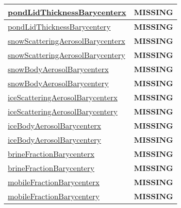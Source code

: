 {\begin{center}
\begin{longtable}{| p{2.0in} | p{4.0in} |}
    \hline
    \hyperref[subsec:var_sec_tracer_barycenter_pondLidThicknessBarycenterx]{pondLidThicknessBarycenterx} & {\bf \color{red} MISSING} \\
    \hline
    \hyperref[subsec:var_sec_tracer_barycenter_pondLidThicknessBarycentery]{pondLidThicknessBarycentery} & {\bf \color{red} MISSING} \\
    \hline
    \hyperref[subsec:var_sec_tracer_barycenter_snowScatteringAerosolBarycenterx]{snowScatteringAerosol\-Barycenterx} & {\bf \color{red} MISSING} \\
    \hline
    \hyperref[subsec:var_sec_tracer_barycenter_snowScatteringAerosolBarycentery]{snowScatteringAerosol\-Barycentery} & {\bf \color{red} MISSING} \\
    \hline
    \hyperref[subsec:var_sec_tracer_barycenter_snowBodyAerosolBarycenterx]{snowBodyAerosolBarycenterx} & {\bf \color{red} MISSING} \\
    \hline
    \hyperref[subsec:var_sec_tracer_barycenter_snowBodyAerosolBarycentery]{snowBodyAerosolBarycentery} & {\bf \color{red} MISSING} \\
    \hline
    \hyperref[subsec:var_sec_tracer_barycenter_iceScatteringAerosolBarycenterx]{iceScatteringAerosolBarycenterx} & {\bf \color{red} MISSING} \\
    \hline
    \hyperref[subsec:var_sec_tracer_barycenter_iceScatteringAerosolBarycentery]{iceScatteringAerosolBarycentery} & {\bf \color{red} MISSING} \\
    \hline
    \hyperref[subsec:var_sec_tracer_barycenter_iceBodyAerosolBarycenterx]{iceBodyAerosolBarycenterx} & {\bf \color{red} MISSING} \\
    \hline
    \hyperref[subsec:var_sec_tracer_barycenter_iceBodyAerosolBarycentery]{iceBodyAerosolBarycentery} & {\bf \color{red} MISSING} \\
    \hline
    \hyperref[subsec:var_sec_tracer_barycenter_brineFractionBarycenterx]{brineFractionBarycenterx} & {\bf \color{red} MISSING} \\
    \hline
    \hyperref[subsec:var_sec_tracer_barycenter_brineFractionBarycentery]{brineFractionBarycentery} & {\bf \color{red} MISSING} \\
    \hline
    \hyperref[subsec:var_sec_tracer_barycenter_mobileFractionBarycenterx]{mobileFractionBarycenterx} & {\bf \color{red} MISSING} \\
    \hline
    \hyperref[subsec:var_sec_tracer_barycenter_mobileFractionBarycentery]{mobileFractionBarycentery} & {\bf \color{red} MISSING} \\

\end{longtable}
\end{center}}
